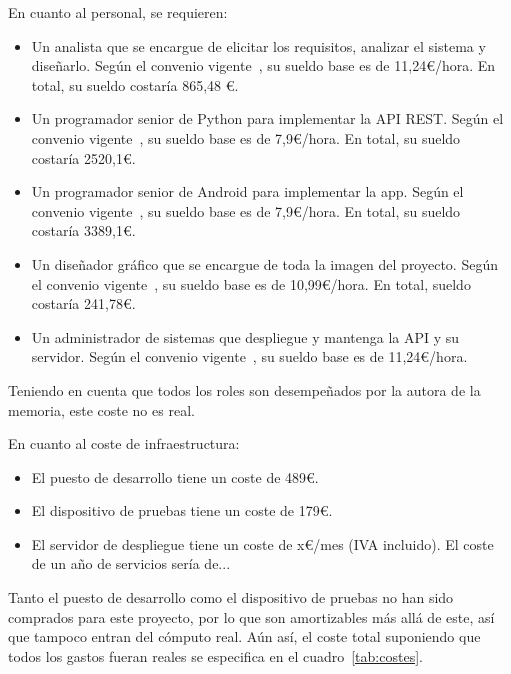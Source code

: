 En cuanto al personal, se requieren:
\begin{itemize}
\item Un analista que se encargue de elicitar los requisitos, analizar el
  sistema y diseñarlo. Según el convenio vigente~\cite{convenio}, su sueldo base
  es de 11,24€/hora. En total, su sueldo costaría 865,48 €.
\item Un programador senior de Python para implementar la API REST. Según el
  convenio vigente~\cite{convenio}, su sueldo base es de 7,9€/hora. En total, su
  sueldo costaría 2520,1€.
\item Un programador senior de Android para implementar la app. Según el
  convenio vigente~\cite{convenio}, su sueldo base es de 7,9€/hora. En total, su
  sueldo costaría 3389,1€.
\item Un diseñador gráfico que se encargue de toda la imagen del proyecto. Según
  el convenio vigente~\cite{convenio}, su sueldo base es de 10,99€/hora. En
  total, sueldo costaría 241,78€.
\item Un administrador de sistemas que despliegue y mantenga la API y su
  servidor. Según el convenio vigente~\cite{convenio}, su sueldo base es de
  11,24€/hora. 
\end{itemize}

Teniendo en cuenta que todos los roles son desempeñados por la autora de la
memoria, este coste no es real.

En cuanto al coste de infraestructura:
\begin{itemize}
\item El puesto de desarrollo tiene un coste de 489€.
\item El dispositivo de pruebas tiene un coste de 179€.
\item El servidor de despliegue tiene un coste de x€/mes (IVA incluido). El coste
  de un año de servicios sería de...
\end{itemize}

Tanto el puesto de desarrollo como el dispositivo de pruebas no han sido
comprados para este proyecto, por lo que son amortizables más allá de este, así
que tampoco entran del cómputo real. Aún así, el coste total suponiendo que todos
los gastos fueran reales se especifica en el cuadro~\ref{tab:costes}.

